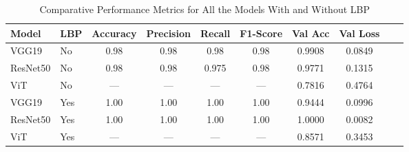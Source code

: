 \documentclass{ijclclp}
\begin{document}
\begin{table}[htbp]
\centering
\caption{Comparative Performance Metrics for All the Models With and Without LBP}
\label{tab:lbp_comparison}
\setlength{\tabcolsep}{8pt} %
\small %
\begin{tabular}{@{} l l c c c c c c c c @{}}
\toprule
\textbf{Model} & \textbf{LBP} & \textbf{Accuracy} & \textbf{Precision} & \textbf{Recall} & \textbf{F1-Score} & \textbf{Val Acc} & \textbf{Val Loss} \\
\midrule
VGG19     & No  & 0.98  & 0.98  & 0.98  & 0.98 & 0.9908 & 0.0849 \\
ResNet50  & No  & 0.98  & 0.98  & 0.975 & 0.98 & 0.9771 & 0.1315 \\
ViT       & No  & ---   & ---   & ---   & ---   & 0.7816 & 0.4764 \\
VGG19     & Yes & 1.00  & 1.00  & 1.00  & 1.00 & 0.9444   & 0.0996 \\
ResNet50  & Yes & 1.00  & 1.00  & 1.00  & 1.00 & 1.0000   & 0.0082 \\
ViT       & Yes & ---   & ---   & ---   & ---   & 0.8571   & 0.3453 \\
\bottomrule
\end{tabular}
\end{table}
\end{document}
